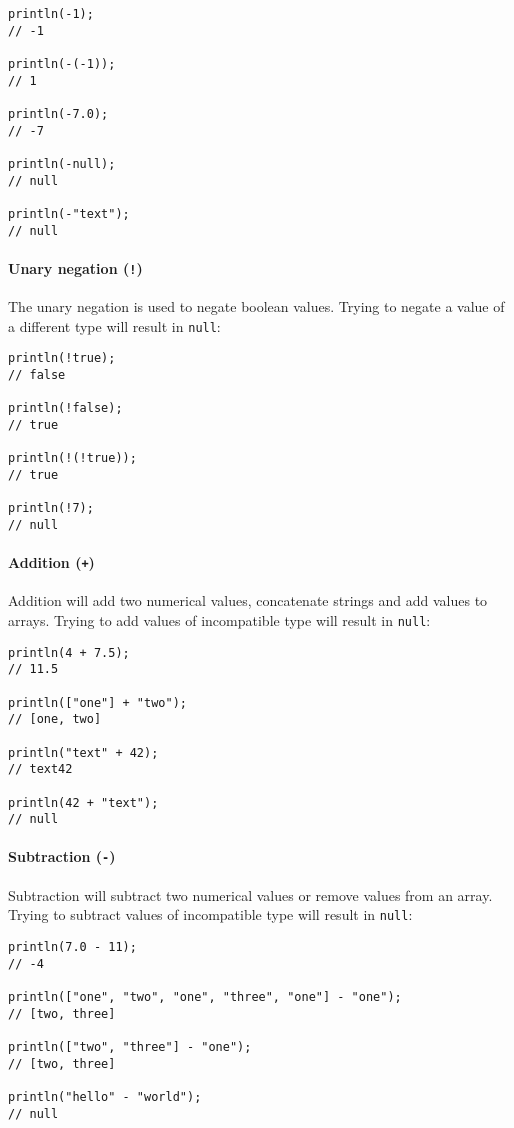 \documentclass[a4paper, parskip, 10pt]{scrartcl}
\begin{document}
\begin{lstlisting}
println(-1);
// -1

println(-(-1));
// 1

println(-7.0);
// -7

println(-null);
// null

println(-"text");
// null
\end{lstlisting}

\paragraph{Unary negation (\texttt{!})}
The unary negation is used to negate boolean values. Trying to negate a value
of a different type will result in \texttt{null}:

\begin{lstlisting}
println(!true);
// false

println(!false);
// true

println(!(!true));
// true

println(!7);
// null
\end{lstlisting}

\paragraph{Addition (\texttt{+})}
Addition will add two numerical values, concatenate strings and add values to
arrays. Trying to add values of incompatible type will result in \texttt{null}:

\begin{lstlisting}
println(4 + 7.5);
// 11.5

println(["one"] + "two");
// [one, two]

println("text" + 42);
// text42

println(42 + "text");
// null
\end{lstlisting}

\paragraph{Subtraction (\texttt{-})}
Subtraction will subtract two numerical values or remove values from an array.
Trying to subtract values of incompatible type will result in \texttt{null}:

\begin{lstlisting}
println(7.0 - 11);
// -4

println(["one", "two", "one", "three", "one"] - "one");
// [two, three]

println(["two", "three"] - "one");
// [two, three]

println("hello" - "world");
// null
\end{lstlisting}
\end{document}
